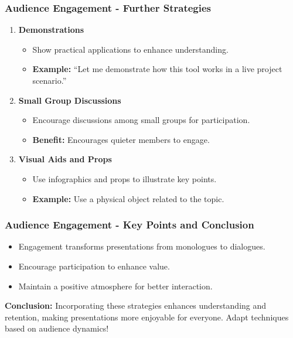 \documentclass{beamer}
\begin{document}
\begin{frame}[fragile]
    \frametitle{Audience Engagement - Further Strategies}
    \begin{enumerate}[resume]
        \item \textbf{Demonstrations}
        \begin{itemize}
            \item Show practical applications to enhance understanding.
            \item \textbf{Example:} “Let me demonstrate how this tool works in a live project scenario.”
        \end{itemize}
        \item \textbf{Small Group Discussions}
        \begin{itemize}
            \item Encourage discussions among small groups for participation.
            \item \textbf{Benefit:} Encourages quieter members to engage.
        \end{itemize}
        \item \textbf{Visual Aids and Props}
        \begin{itemize}
            \item Use infographics and props to illustrate key points.
            \item \textbf{Example:} Use a physical object related to the topic.
        \end{itemize}
    \end{enumerate}
\end{frame}

\begin{frame}[fragile]
    \frametitle{Audience Engagement - Key Points and Conclusion}
    \begin{itemize}
        \item Engagement transforms presentations from monologues to dialogues.
        \item Encourage participation to enhance value.
        \item Maintain a positive atmosphere for better interaction.
    \end{itemize}
    \vspace{0.5cm}
    \textbf{Conclusion:} Incorporating these strategies enhances understanding and retention, making presentations more enjoyable for everyone. Adapt techniques based on audience dynamics!
\end{frame}
\end{document}
